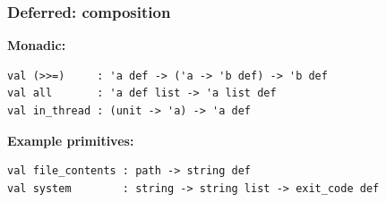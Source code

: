 \documentclass{beamer}
\begin{document}
% 
% 
%



\begin{frame}[fragile]
\frametitle{Deferred: composition}
{\bf Monadic:}
{\footnotesize
\begin{verbatim}
val (>>=)     : 'a def -> ('a -> 'b def) -> 'b def
val all       : 'a def list -> 'a list def
val in_thread : (unit -> 'a) -> 'a def
\end{verbatim}}
{\bf Example primitives:}
{\footnotesize
\begin{verbatim}
val file_contents : path -> string def
val system        : string -> string list -> exit_code def
\end{verbatim}}
\end{frame}



%

% 
\end{document}
